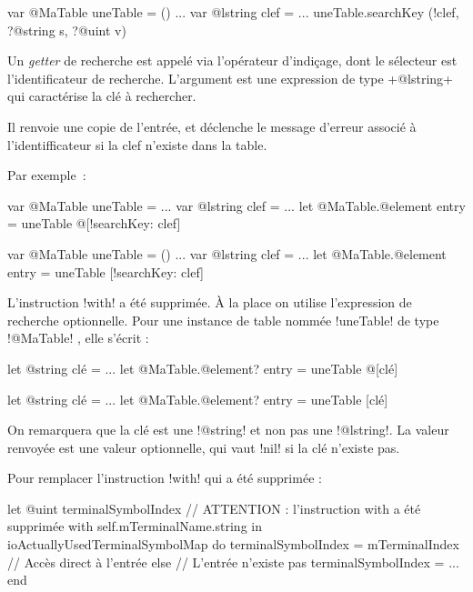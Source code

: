 \begin{galgas4}
var @MaTable uneTable = ()
...
var @lstring clef = ...
uneTable.searchKey (!clef, ?@string s, ?@uint v)
\end{galgas4}






Un \emph{getter} de recherche est appelé via l'opérateur d'indiçage, dont le sélecteur est l'identificateur de recherche. L'argument est une expression de type \ggst+@lstring+ qui caractérise la clé à rechercher.

Il renvoie une copie de l'entrée, et déclenche le message d'erreur associé à l'identifficateur si la clef n'existe dans la table. 


Par exemple~:
\begin{galgas3}
var @MaTable uneTable = {}
...
var @lstring clef = ...
let @MaTable.@element entry = uneTable @[!searchKey: clef]
\end{galgas3}

\begin{galgas4}
var @MaTable uneTable = ()
...
var @lstring clef = ...
let @MaTable.@element entry = uneTable [!searchKey: clef]
\end{galgas4}









L'instruction \ggst!with! a été supprimée. À la place on utilise l'expression de recherche optionnelle. Pour une instance de table nommée \ggst!uneTable! de type \ggst!@MaTable! , elle s'écrit :

\begin{galgas3}
let @string clé = ...
let @MaTable.@element? entry = uneTable @[clé]
\end{galgas3}

\begin{galgas4}
let @string clé = ...
let @MaTable.@element? entry = uneTable [clé]
\end{galgas4}

On remarquera que la clé est une \ggsq!@string! et non pas une \ggsq!@lstring!. La valeur renvoyée est une valeur optionnelle, qui vaut \ggsq!nil! si la clé n'existe pas.

Pour remplacer l'instruction \ggsq!with! qui a été supprimée :

\begin{galgas3}
let @uint terminalSymbolIndex
// ATTENTION : l'instruction with a été supprimée
with self.mTerminalName.string in ioActuallyUsedTerminalSymbolMap do
  terminalSymbolIndex = mTerminalIndex // Accès direct à l'entrée
else // L'entrée n'existe pas
  terminalSymbolIndex = ...
end
\end{galgas3}

